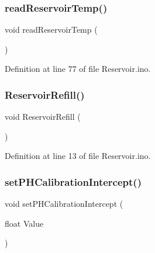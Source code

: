 \mbox{\label{_reservoir_8ino_a1611ada2370af3e62610eefcdb2cf7a8}} 
\subsubsection{\texorpdfstring{readReservoirTemp()}{readReservoirTemp()}}
{\footnotesize\ttfamily void read\+Reservoir\+Temp (\begin{DoxyParamCaption}{ }\end{DoxyParamCaption})}



Definition at line 77 of file Reservoir.\+ino.

\mbox{\label{_reservoir_8ino_a06ca90b9184e86f42c4b2af23ec6aff8}} 
\subsubsection{\texorpdfstring{ReservoirRefill()}{ReservoirRefill()}}
{\footnotesize\ttfamily void Reservoir\+Refill (\begin{DoxyParamCaption}{ }\end{DoxyParamCaption})}



Definition at line 13 of file Reservoir.\+ino.

\mbox{\label{_reservoir_8ino_a24d5d5316e33b75bccff61af79ccff8c}} 
\subsubsection{\texorpdfstring{setPHCalibrationIntercept()}{setPHCalibrationIntercept()}}
{\footnotesize\ttfamily void set\+P\+H\+Calibration\+Intercept (\begin{DoxyParamCaption}\item[{float}]{Value }\end{DoxyParamCaption})}



